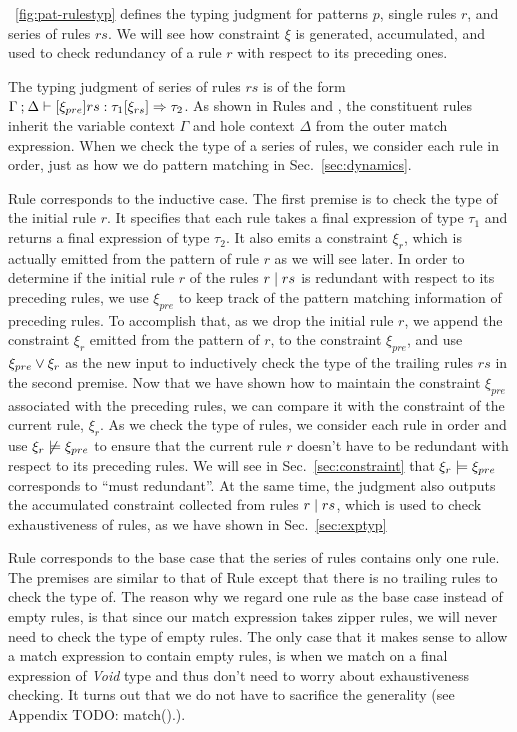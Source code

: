 \documentclass[runningheads,envcountsame,a4paper]{llncs}
\newcommand{\todo}[1]{{\color{red} TODO: #1}}
\begin{document}


\figurename~\ref{fig:pat-rulestyp} defines the typing judgment for patterns $p$,
single rules $r$, and series of rules $rs$. We will see how constraint $\xi$ is
generated, accumulated, and used to check redundancy of a rule $r$ with respect
to its preceding ones.

The typing judgment of series of rules $rs$ is of the form
$\Gamma \mathbin{;} \Delta \vdash [\xi_{pre}] rs : \tau_1 [\xi_{rs}] \Rightarrow \tau_2$. As shown
in Rules \TMatchZPre and \TMatchNZPre, the constituent rules inherit the
variable context $\Gamma$ and hole context $\Delta$ from the outer match
expression. When we check the type of a series of rules, we consider each rule
in order, just as how we do pattern matching in Sec.~\ref{sec:dynamics}.

Rule \TRules corresponds to the inductive case. The first premise is to check
the type of the initial rule $r$. It specifies that each rule takes a final expression
of type $\tau_1$ and returns a final expression of type $\tau_2$. It also emits
a constraint $\xi_r$, which is actually emitted from the pattern of rule $r$ as
we will see later. In order to determine if the initial rule $r$ of the rules
$r \mid rs$ is redundant with respect to its preceding rules, we use
$\xi_{pre}$ to keep track of the pattern matching information of preceding
rules. To accomplish that, as we drop the initial rule $r$, we append the
constraint $\xi_r$ emitted from the pattern of $r$, to the constraint
$\xi_{pre}$, and use $\xi_{pre} \vee \xi_r$ as the new input to inductively check the type
of the trailing rules $rs$ in the second premise. Now that we have shown how to maintain the
constraint $\xi_{pre}$ associated with the preceding rules, we can compare it
with the constraint of the current rule, $\xi_r$. As we check the
type of rules, we consider each rule in order and use
$\xi_r \not\models \xi_{pre}$ to ensure that the current rule $r$ doesn't
have to be redundant with respect to its preceding rules. We will see in
Sec.~\ref{sec:constraint} that $\xi_r \models \xi_{pre}$ corresponds to
``must redundant''. At the same time, the judgment also outputs the accumulated
constraint collected from rules $r \mid rs$, which is used to check
exhaustiveness of rules, as we have shown in Sec.~\ref{sec:exptyp}

Rule \TOneRules corresponds to the base case that the series of rules contains
only one rule. The premises are similar to that of Rule \TRules except that
there is no trailing rules to check the type of. The reason why we regard one
rule as the base case instead of empty rules, is that since our match expression
takes zipper rules, we will never need to check the type of empty rules. The
only case that it makes sense to allow a match expression to contain empty
rules, is when we match on a final expression of \textit{Void} type and thus
don't need to worry about exhaustiveness checking. It turns out that we do not
have to sacrifice the generality (see Appendix \todo{match(){.}}).
\end{document}
